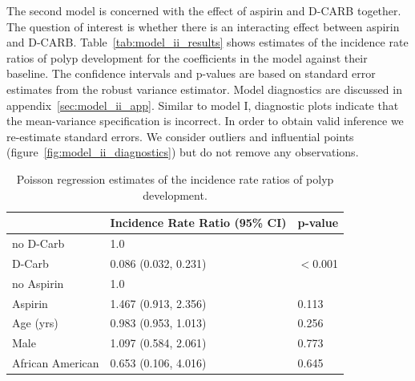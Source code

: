 \documentclass[paper=a4, fontsize=11pt]{scrartcl} %
\numberwithin{equation}{section} %
\numberwithin{figure}{section} %
\numberwithin{table}{section} %
\begin{document}
The second model is concerned with the effect of aspirin and D-CARB together. The question of interest is whether there is an interacting effect between aspirin and D-CARB. Table~\ref{tab:model_ii_results} shows estimates of the incidence rate ratios of polyp development for the coefficients in the model against their baseline. The confidence intervals and p-values are based on standard error estimates from the robust variance estimator. Model diagnostics are discussed in appendix~\ref{sec:model_ii_app}. Similar to model I, diagnostic plots indicate that the mean-variance specification is incorrect. In order to obtain valid inference we re-estimate standard errors. We consider outliers and influential points (figure~\ref{fig:model_ii_diagnostics}) but do not remove any observations.\\

\captionsetup{width=.5\textwidth}
\begin{table}
\centering
\caption{Poisson regression estimates of the incidence rate ratios of polyp development.}
\label{tab:model_i_results}
\begin{tabular}{m{2cm} m{3.5cm} l}
  \hline
 & Incidence Rate Ratio (95\% CI) & p-value \\ 
  \hline
  no D-Carb & 1.0 & \\
  D-Carb & 0.086 (0.032, 0.231) & $<$0.001 \\ 
  no Aspirin & 1.0 &  \\ 
  Aspirin & 1.467 (0.913, 2.356) & 0.113 \\ 
  Age (yrs) & 0.983 (0.953, 1.013) & 0.256 \\ 
  Male & 1.097 (0.584, 2.061) & 0.773 \\ 
  African American & 0.653 (0.106, 4.016) & 0.645 \\ 
   \hline
\end{tabular}
\end{table}
\end{document}
